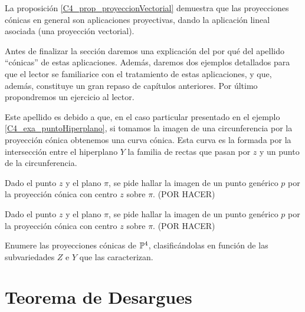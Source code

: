 La proposición \ref*{C4_prop_proyeccionVectorial} demuestra que las proyecciones cónicas en general son aplicaciones proyectivas, dando la aplicación lineal asociada (una proyección vectorial).

Antes de finalizar la sección daremos una explicación del por qué del apellido ``cónicas'' de estas aplicaciones. Además, daremos dos ejemplos detallados para que el lector se familiarice con el tratamiento de estas aplicaciones, y que, además, constituye un gran repaso de capítulos anteriores. Por último propondremos un ejercicio al lector.

\begin{obs}[Cónicas]
	\label{C4_obs_conicas}
	Este apellido es debido a que, en el caso particular presentado en el ejemplo \ref{C4_exa_puntoHiperplano}, si tomamos la imagen de una circunferencia por la proyección cónica obtenemos una curva cónica. Esta curva es la formada por la intersección entre el hiperplano $Y$ la familia de rectas que pasan por $z$ y un punto de la circunferencia.
\end{obs}
\begin{exa}
	Dado el punto $z$ y el plano $\pi$, se pide hallar la imagen de un punto genérico $p$ por la proyección cónica con centro $z$ sobre $\pi$.
	(POR HACER)
\end{exa}

\begin{exa}
	Dado el punto $z$ y el plano $\pi$, se pide hallar la imagen de un punto genérico $p$ por la proyección cónica con centro $z$ sobre $\pi$.
	(POR HACER)
\end{exa}

\begin{prob}
	Enumere las proyecciones cónicas de $\mathbb{P}^4$, clasificándolas en función de las subvariedades $Z$ e $Y$ que las caracterizan.
\end{prob}
\section{Teorema de Desargues}